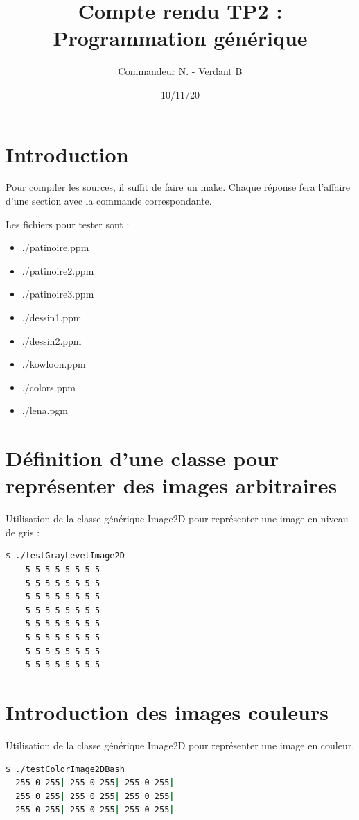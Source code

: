 \documentclass[a4paper,10pt]{article}
\title{Compte rendu TP2 : Programmation générique}
\date{10/11/20}
\author{Commandeur N. - Verdant B}
\begin{document}
\maketitle
{}
\newpage

  \section{Introduction}
   Pour compiler les sources, il suffit de faire un make. Chaque réponse fera l'affaire d'une section avec la commande correspondante.
  
  Les fichiers pour tester sont :
  \begin{itemize}
    \item ./patinoire.ppm
    \item ./patinoire2.ppm
    \item ./patinoire3.ppm
    \item ./dessin1.ppm
    \item ./dessin2.ppm
    \item ./kowloon.ppm
    \item ./colors.ppm
    \item ./lena.pgm

  \end{itemize}


  \section{Définition d'une classe pour représenter des images arbitraires}
  Utilisation de la classe générique Image2D pour représenter une image en niveau de gris :
  \begin{lstlisting}[language=Bash]
  $ ./testGrayLevelImage2D  
    5 5 5 5 5 5 5 5
    5 5 5 5 5 5 5 5
    5 5 5 5 5 5 5 5
    5 5 5 5 5 5 5 5
    5 5 5 5 5 5 5 5
    5 5 5 5 5 5 5 5
    5 5 5 5 5 5 5 5
    5 5 5 5 5 5 5 5
  \end{lstlisting}
  \section{Introduction des images couleurs}
  Utilisation de la classe générique Image2D pour représenter une image en couleur.
  \begin{lstlisting}[language=Bash]
  $ ./testColorImage2DBash
  255 0 255| 255 0 255| 255 0 255| 
  255 0 255| 255 0 255| 255 0 255| 
  255 0 255| 255 0 255| 255 0 255| 
  \end{lstlisting}
    \pagebreak
\end{document}
